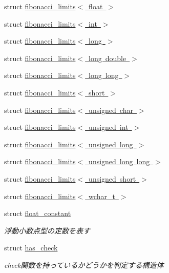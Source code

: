 \begin{DoxyCompactItemize}
\item 
struct \mbox{\hyperlink{structsaki_1_1fibonacci__limits_3_01float_01_4}{fibonacci\+\_\+limits$<$ float $>$}}
\item 
struct \mbox{\hyperlink{structsaki_1_1fibonacci__limits_3_01int_01_4}{fibonacci\+\_\+limits$<$ int $>$}}
\item 
struct \mbox{\hyperlink{structsaki_1_1fibonacci__limits_3_01long_01_4}{fibonacci\+\_\+limits$<$ long $>$}}
\item 
struct \mbox{\hyperlink{structsaki_1_1fibonacci__limits_3_01long_01double_01_4}{fibonacci\+\_\+limits$<$ long double $>$}}
\item 
struct \mbox{\hyperlink{structsaki_1_1fibonacci__limits_3_01long_01long_01_4}{fibonacci\+\_\+limits$<$ long long $>$}}
\item 
struct \mbox{\hyperlink{structsaki_1_1fibonacci__limits_3_01short_01_4}{fibonacci\+\_\+limits$<$ short $>$}}
\item 
struct \mbox{\hyperlink{structsaki_1_1fibonacci__limits_3_01unsigned_01char_01_4}{fibonacci\+\_\+limits$<$ unsigned char $>$}}
\item 
struct \mbox{\hyperlink{structsaki_1_1fibonacci__limits_3_01unsigned_01int_01_4}{fibonacci\+\_\+limits$<$ unsigned int $>$}}
\item 
struct \mbox{\hyperlink{structsaki_1_1fibonacci__limits_3_01unsigned_01long_01_4}{fibonacci\+\_\+limits$<$ unsigned long $>$}}
\item 
struct \mbox{\hyperlink{structsaki_1_1fibonacci__limits_3_01unsigned_01long_01long_01_4}{fibonacci\+\_\+limits$<$ unsigned long long $>$}}
\item 
struct \mbox{\hyperlink{structsaki_1_1fibonacci__limits_3_01unsigned_01short_01_4}{fibonacci\+\_\+limits$<$ unsigned short $>$}}
\item 
struct \mbox{\hyperlink{structsaki_1_1fibonacci__limits_3_01wchar__t_01_4}{fibonacci\+\_\+limits$<$ wchar\+\_\+t $>$}}
\item 
struct \mbox{\hyperlink{structsaki_1_1float__constant}{float\+\_\+constant}}
\begin{DoxyCompactList}\small\item\em 浮動小数点型の定数を表す \end{DoxyCompactList}\item 
struct \mbox{\hyperlink{structsaki_1_1has__check}{has\+\_\+check}}
\begin{DoxyCompactList}\small\item\em check関数を持っているかどうかを判定する構造体 \end{DoxyCompactList}\item 

\end{DoxyCompactItemize}
